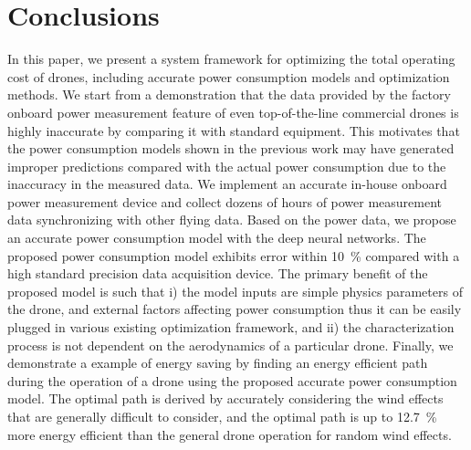 \documentclass[journal]{./template/IEEEtran}
\begin{document}
\section{Conclusions}

In this paper, we present a system framework for optimizing the total operating cost of drones, including accurate power consumption models and optimization methods.
We start from a demonstration that the data provided by the factory onboard power measurement feature of even top-of-the-line commercial drones is highly inaccurate by comparing it with standard equipment. 
This motivates that the power consumption models shown in the previous work may have generated improper predictions compared with the actual power consumption due to the inaccuracy in the measured data.
We implement an accurate in-house onboard power measurement device and collect dozens of hours of power measurement data synchronizing with other flying data. 
Based on the power data, we propose an accurate power consumption model with the deep neural networks. 
The proposed power consumption model exhibits error within 10~\% compared with a high standard precision data acquisition device. 
The primary benefit of the proposed model is such that i) the model inputs are simple physics parameters of the drone, and external factors affecting power consumption thus it can be easily plugged in various existing optimization framework, and ii) the characterization process is not dependent on the aerodynamics of a particular drone. %
Finally, we demonstrate a example of energy saving by finding an energy efficient path during the operation of a drone using the proposed accurate power consumption model. The optimal path is derived by accurately considering the wind effects that are generally difficult to consider, and the optimal path is up to 12.7~\% more energy efficient than the general drone operation for random wind effects.








\end{document}

